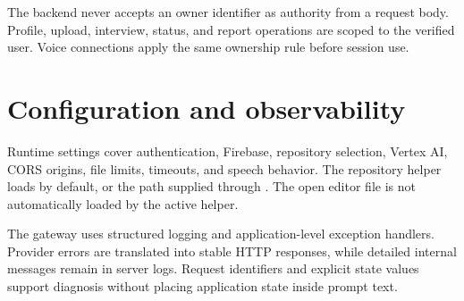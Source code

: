 
The backend never accepts an owner identifier as authority from a request body. Profile, upload, interview, status, and report operations are scoped to the verified user. Voice connections apply the same ownership rule before session use.

\section{Configuration and observability}

Runtime settings cover authentication, Firebase, repository selection, Vertex AI, CORS origins, file limits, timeouts, and speech behavior. The repository helper loads  by default, or the path supplied through . The open editor file  is not automatically loaded by the active helper.

The gateway uses structured logging and application-level exception handlers. Provider errors are translated into stable HTTP responses, while detailed internal messages remain in server logs. Request identifiers and explicit state values support diagnosis without placing application state inside prompt text.
